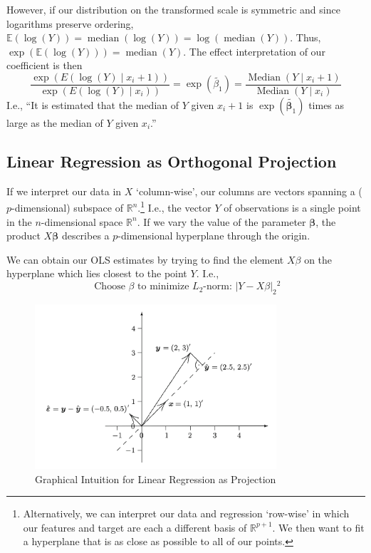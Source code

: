 \documentclass[11pt, %
	oneside, %
	english, %
	onehalfspacing, %
	]{article} %
\numberwithin{equation}{section}
\begin{document}
However, if our distribution on the transformed scale is symmetric and since logarithms preserve ordering, $\mathbb{E}(\log(Y)) = \operatorname{median}(\log(Y)) = \log (\operatorname{median}(Y))$. Thus, $\exp (\mathbb{E}(\log (Y)))=\operatorname{median}(Y)$. The effect interpretation of our coefficient is then
\begin{equation*}
    \frac{\exp \left(E\left(\log (Y) \mid x_i+1\right)\right)}{\exp \left(E\left(\log (Y) \mid x_i\right)\right)}=\exp \left(\tilde{\beta_1}\right)=\frac{\operatorname{Median}\left(Y \mid x_i+1\right)}{\operatorname{Median}\left(Y \mid x_i\right)}
\end{equation*}
I.e., ``It is estimated that the median of $Y$ given $x_i+1$ is $\exp \left(\tilde{\mathbf{\beta}_1}\right)$ times as large as the median of $Y$ given $x_i$.''



\subsection{Linear Regression as Orthogonal Projection}

If we interpret our data in $X$ `column-wise', our columns are vectors spanning a ($p$-dimensional) subspace of $\mathbb{R}^n$.\footnote{Alternatively, we can interpret our data and regression `row-wise' in which our features and target are each a different basis of $\mathbb{R}^{p+1}$. We then want to fit a hyperplane that is as close as possible to all of our points.} I.e., the vector $Y$ of observations is a single point in the $n$-dimensional space $\mathbb{R}^n$. If we vary the value of the parameter $\mathbf{\beta}$, the product $X \mathbf{\beta}$ describes a $p$-dimensional hyperplane through the origin.

We can obtain our OLS estimates by trying to find the element $X \beta$ on the hyperplane which lies closest to the point $Y$. I.e.,
\begin{equation*}
    \text { Choose } \beta \text { to minimize } L_2 \text {-norm: }|Y-X \beta|_2{ }^2
\end{equation*}

\begin{figure}
    \caption{Graphical Intuition for Linear Regression as Projection}
    \label{fig:orth_linreg}
    \begin{center}
        \includegraphics[width = 0.8\textwidth]{regression_orthogonal.png}
    \end{center}
\end{figure}
\end{document}
